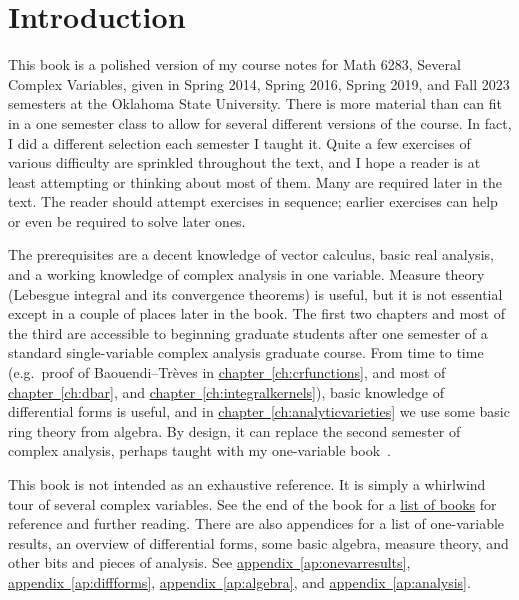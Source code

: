 \documentclass[12pt,openany]{book}
\theoremstyle{plain}
\theoremstyle{remark}
\theoremstyle{definition}
\theoremstyle{exercise}
\theoremstyle{example}
\newcommand{\chapterref}[1]{\hyperref[#1]{chapter~\ref*{#1}}}
\newcommand{\appendixref}[1]{\hyperref[#1]{appendix~\ref*{#1}}}
\begin{document}
\chapter*{Introduction} \label{ch:intro}


This book is a polished version of my course notes for Math 6283, Several
Complex Variables, given in
Spring 2014, Spring 2016, Spring 2019, and Fall 2023 semesters
at the Oklahoma State University.
There is more material than can fit in a one semester class
to allow for several different versions of the course.
In fact, I did a different selection each semester I taught it.
Quite a few exercises of various difficulty are
sprinkled throughout the text, and I hope a reader is
at least attempting or thinking about most of them.
Many are required later in the text.
The reader should attempt exercises in sequence; earlier exercises
can help or even be required to solve later ones.

The prerequisites are a decent knowledge of vector calculus, basic
real analysis, and a working knowledge of complex analysis in one variable.
Measure theory (Lebesgue integral and its convergence theorems) is useful,
but it is not essential except in a couple of places later in the book.
The first two chapters and most of the third
are accessible to beginning graduate students after one semester
of a standard single-variable complex
analysis graduate course.
From time to time (e.g.\ proof of Baouendi--Tr\`eves in
\chapterref{ch:crfunctions},
and most of
\chapterref{ch:dbar}, and \chapterref{ch:integralkernels}),
basic knowledge of differential forms is useful, and
in \chapterref{ch:analyticvarieties}
we use some basic ring theory from algebra.
By design, it can replace the second semester of complex analysis,
perhaps taught with my one-variable book~\cite{Lebl:ca}.

This book is not intended as an exhaustive reference.
It is simply a whirlwind tour of several complex variables.
See the end of the book
for a \hyperref[ch:furtherreading]{list of books} for
reference and further reading.  There are also appendices for
a list of one-variable results, an overview of differential forms,
some basic algebra, measure theory, and other bits and pieces of analysis.
See \appendixref{ap:onevarresults},
\appendixref{ap:diffforms},
\appendixref{ap:algebra}, and
\appendixref{ap:analysis}.
\end{document}
